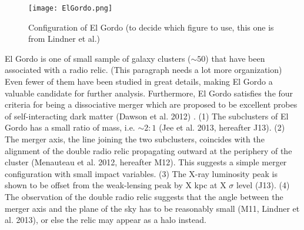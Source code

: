 %
%
\begin{figure}
	\texttt{[image: ElGordo.png]}
	\caption{Configuration of El Gordo (to decide which figure to use,
	this one is from Lindner et al.) \label{fig:config}}
\end{figure}
El Gordo is one of small sample of galaxy clusters ($\sim 50$) that have
been associated with a radio relic. (This paragraph needs a lot more
organization) Even fewer of them have been studied in
great details, making El Gordo a valuable candidate for further analysis. 
%
%
Furthermore, El Gordo satisfies the four criteria for being a dissociative merger which are proposed to be excellent
probes of self-interacting dark matter (Dawson et al. 2012) . (1) The subclusters
of El Gordo has a small ratio of mass, i.e. $\sim 2:1$ (Jee et al. 2013,
hereafter J13). (2) The merger axis, the line joining the two subclusters,
coincides with the alignment of the double radio relic propagating outward at the periphery of the cluster (Menauteau et al. 2012,
hereafter M12). This suggests a simple merger configuration with small
impact variables.  (3) The X-ray luminosity peak is shown to be offset
from the weak-lensing peak by X kpc at X $\sigma$ level (J13). (4) The
observation of the double radio relic suggests that the angle between the
merger axis and the plane of the sky has to be reasonably small (M11,
Lindner et al. 2013), or else
the relic may appear as a halo instead. \citep{S13} \par 


